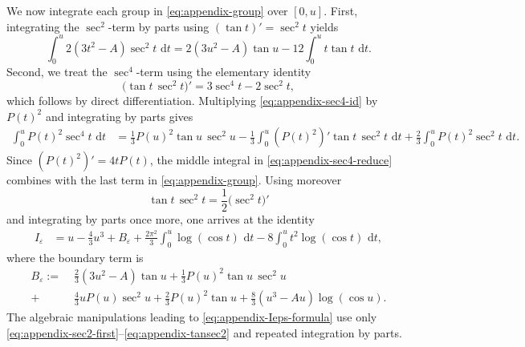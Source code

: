 \documentclass[11pt]{article}
\newcommand{\dd}{\,\mathrm{d}}
\begin{document}
We now integrate each group in \eqref{eq:appendix-group} over $[0,u]$.
First, integrating the $\sec^2$-term by parts using $(\tan t)'=\sec^2 t$ yields
\begin{equation}
\label{eq:appendix-sec2-first}
\int_0^u 2(3t^2-A)\sec^2 t\,\dd t
= 2(3u^2-A)\tan u - 12\int_0^u t\tan t\,\dd t.
\end{equation}
Second, we treat the $\sec^4$-term using the elementary identity
\begin{equation}
\label{eq:appendix-sec4-id}
\bigl(\tan t\,\sec^2 t\bigr)' = 3\sec^4 t - 2\sec^2 t,
\end{equation}
which follows by direct differentiation.
Multiplying \eqref{eq:appendix-sec4-id} by $P(t)^2$ and integrating by parts gives
\begin{align}
\label{eq:appendix-sec4-reduce}
\int_0^u P(t)^2\sec^4 t\,\dd t
&= \frac13 P(u)^2\tan u\,\sec^2 u
 - \frac13\int_0^u (P(t)^2)'\tan t\,\sec^2 t\,\dd t
 + \frac23\int_0^u P(t)^2\sec^2 t\,\dd t.
\end{align}
Since $(P(t)^2)'=4tP(t)$, the middle integral in \eqref{eq:appendix-sec4-reduce} combines with the last term in \eqref{eq:appendix-group}.
Using moreover
\begin{equation}
\label{eq:appendix-tansec2}
\tan t\,\sec^2 t = \frac12\bigl(\sec^2 t\bigr)'
\end{equation}
and integrating by parts once more, one arrives at the identity
\begin{align}
\label{eq:appendix-Ieps-formula}
I_{\varepsilon}
&=
u-\frac{4}{3}u^3
 + B_{\varepsilon}
 + \frac{2\pi^2}{3}\int_0^u \log(\cos t)\,\dd t
 - 8\int_0^u t^2\log(\cos t)\,\dd t,
\end{align}
where the boundary term is
\begin{align}
\label{eq:appendix-boundary}
B_{\varepsilon}
:=\;&
\frac{2}{3}(3u^2-A)\tan u
+\frac{1}{3}P(u)^2\tan u\,\sec^2 u\nonumber\\
+&\frac{4}{3}uP(u)\sec^2 u
+\frac{2}{3}P(u)^2\tan u
+\frac{8}{3}(u^3-Au)\log(\cos u).
\end{align}
The algebraic manipulations leading to \eqref{eq:appendix-Ieps-formula} use only \eqref{eq:appendix-sec2-first}--\eqref{eq:appendix-tansec2} and repeated integration by parts.
\end{document}
